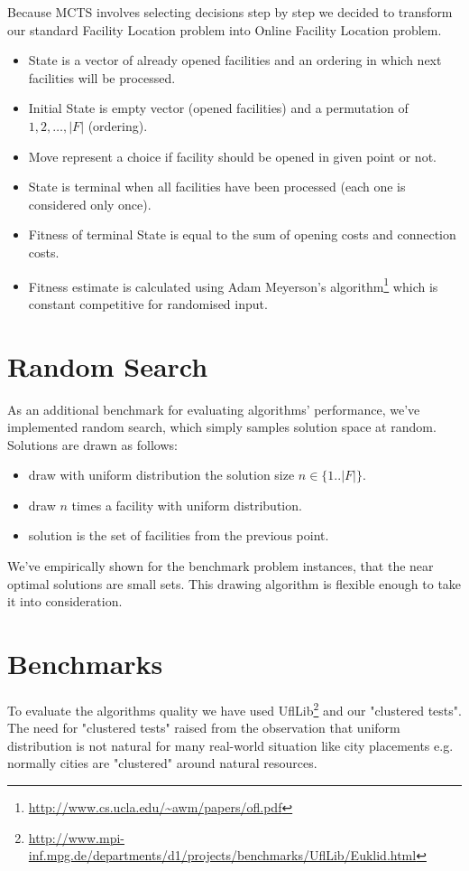 Because MCTS involves selecting decisions step by step we decided to transform our
standard Facility Location problem into Online Facility Location problem.
\begin{itemize}
\item State is a vector of already opened facilities and an ordering in which
next facilities will be processed.
\item Initial State is empty vector (opened facilities) and a permutation
of $1,2,\dots, |F|$ (ordering).
\item Move represent a choice if facility should be opened in given point or not.
\item State is terminal when all facilities have been processed (each one is
considered only once).
\item Fitness of terminal State is equal to the sum of opening costs and connection costs.
\item Fitness estimate is calculated using Adam Meyerson's algorithm\footnote{\url{http://www.cs.ucla.edu/~awm/papers/ofl.pdf}}
which is constant competitive for randomised input.
\end{itemize}

\section{Random Search}

As an additional benchmark for evaluating algorithms' performance, we've implemented
random search, which simply samples solution space at random. Solutions are drawn as follows:
\begin{itemize}
\item draw with uniform distribution the solution size $n \in \{1..|F|\}$.
\item draw $n$ times a facility with uniform distribution.
\item solution is the set of facilities from the previous point.
\end{itemize}

We've empirically shown for the benchmark problem instances, that the near optimal
solutions are small sets. This drawing algorithm is flexible enough to take it
into consideration.

\section{Benchmarks}
To evaluate the algorithms quality we have used UflLib\footnote{\url{http://www.mpi-inf.mpg.de/departments/d1/projects/benchmarks/UflLib/Euklid.html}}
and our "clustered tests". The need for "clustered tests" raised from the observation that
uniform distribution is not natural for many real-world situation like city placements
e.g. normally cities are "clustered" around natural resources.

